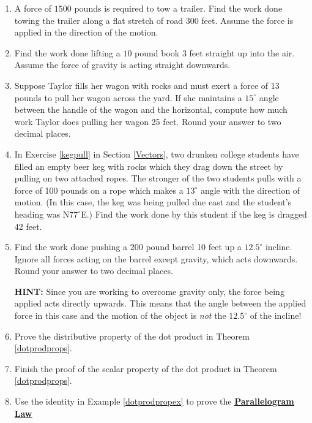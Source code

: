 \begin{enumerate}

\setcounter{enumi}{\value{HW}}

\item  A force of $1500$ pounds is required to tow a trailer.  Find the work done towing the trailer along a flat stretch of road $300$ feet.  Assume the force is applied in the direction of the motion.

\item  Find the work done lifting a $10$ pound book $3$ feet straight up into the air.  Assume the force of gravity is acting straight downwards.

\item  Suppose Taylor fills her wagon with rocks and must exert a force of 13 pounds to pull her wagon across the yard.  If she maintains a $15^{\circ}$ angle between the handle of the wagon and the horizontal, compute how much work Taylor does pulling her wagon 25 feet.  Round your answer to two decimal places.

\item In Exercise \ref{kegpull} in Section \ref{Vectors}, two drunken college students have filled an empty beer keg with rocks which they drag down the street by pulling on two attached ropes.  The stronger of the two students pulls with a force of 100 pounds on a rope which makes a $13^{\circ}$ angle with the direction of motion.  (In this case, the keg was being pulled due east and the student's heading was N$77^{\circ}$E.)  Find the work done by this student if the keg is dragged 42 feet.

\item  Find the work done pushing a 200 pound barrel 10 feet up a $12.5^{\circ}$ incline. Ignore all forces acting on the barrel except gravity, which acts downwards.  Round your answer to two decimal places.

\textbf{HINT:}  Since you are working to overcome gravity only, the force being applied acts directly upwards. This means that the angle between the applied force in this case and the motion of the object is \textit{not} the $12.5^{\circ}$ of the incline!

\item Prove the distributive property of the dot product in Theorem \ref{dotprodprops}.

\item Finish the proof of the scalar property of the dot product in Theorem \ref{dotprodprops}.

\item Use the identity in Example \ref{dotprodpropex} to prove the \href{http://en.wikipedia.org/wiki/Parallelogram_law}{\underline{\textbf{Parallelogram Law}}}


\end{enumerate}
